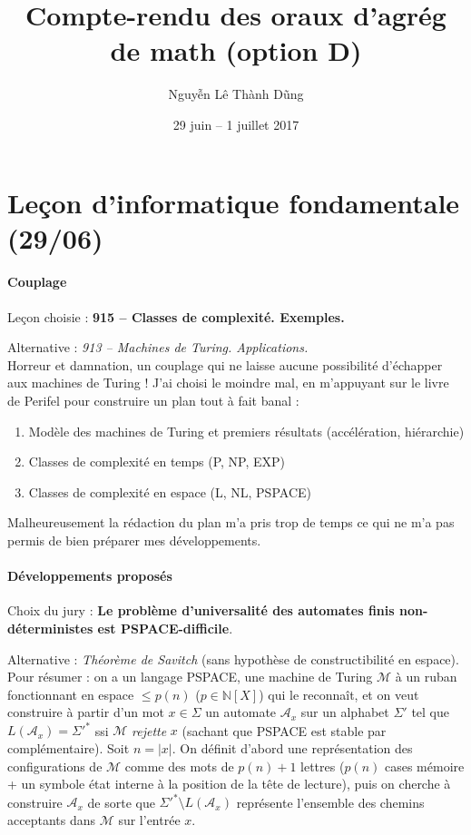 \documentclass[a4paper, 11pt]{article}
\begin{document}
\title{Compte-rendu des oraux d'agrég de math (option D)}
\author{Nguyễn Lê Thành Dũng}
\date{29 juin -- 1 juillet 2017}
\maketitle

\section*{Leçon d'informatique fondamentale (29/06)}

\paragraph{Couplage}

Leçon choisie : \textbf{915 -- Classes de complexité. Exemples.}

Alternative : \emph{913 -- Machines de Turing. Applications.}\\

Horreur et damnation, un couplage qui ne laisse aucune possibilité d'échapper
aux machines de Turing ! J'ai choisi le moindre mal, en m'appuyant sur le livre
de Perifel pour construire un plan tout à fait banal :
\begin{enumerate}
\item Modèle des machines de Turing et premiers résultats (accélération,
  hiérarchie)
\item Classes de complexité en temps (P, NP, EXP)
\item Classes de complexité en espace (L, NL, PSPACE)
\end{enumerate}
Malheureusement la rédaction du plan m'a pris trop de temps ce qui ne m'a pas
permis de bien préparer mes développements.

\paragraph{Développements proposés}

Choix du jury : \textbf{Le problème d'universalité des automates finis
  non-déterministes est PSPACE-difficile}.

Alternative : \emph{Théorème de Savitch} (sans hypothèse de constructibilité en
espace).\\

Pour résumer : on a un langage PSPACE, une machine de Turing $\mathcal{M}$ à un
ruban fonctionnant en espace $\leq p(n)$ ($p \in \mathbb{N}[X]$) qui le
reconnaît, et on veut construire à partir d'un mot $x \in \Sigma$ un automate
$\mathcal{A}_x$ sur un alphabet $\Sigma'$ tel que $L(\mathcal{A}_x) = \Sigma'^*$
ssi $\mathcal{M}$ \emph{rejette} $x$ (sachant que PSPACE est stable par
complémentaire). Soit $n = |x|$. On définit d'abord une représentation des
configurations de $\mathcal{M}$ comme des mots de $p(n)+1$ lettres ($p(n)$ cases
mémoire + un symbole état interne à la position de la tête de lecture), puis on
cherche à construire $\mathcal{A}_x$ de sorte que $\Sigma'^* \setminus
L(\mathcal{A}_x)$ représente l'ensemble des chemins acceptants dans
$\mathcal{M}$ sur l'entrée $x$.
\end{document}
